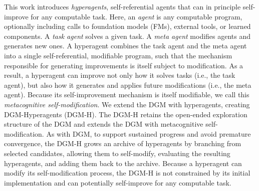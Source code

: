 \documentclass[]{fairmeta}
\begin{document}
This work introduces \textit{hyperagents}, self-referential agents that can in principle self-improve for any computable task. Here, an \textit{agent} is any computable program, optionally including calls to foundation models (FMs), external tools, or learned components. A \textit{task agent} solves a given task. A \textit{meta agent} modifies agents and generates new ones. A hyperagent combines the task agent and the meta agent into a single self-referential, modifiable program, such that the mechanism responsible for generating improvements is itself subject to modification. As a result, a hyperagent can improve not only how it solves tasks (i.e., the task agent), but also how it generates and applies future modifications (i.e., the meta agent). Because its self-improvement mechanism is itself modifiable, we call this \textit{metacognitive self-modification}.
We extend the DGM with hyperagents, creating DGM-Hyperagents (DGM-H). The DGM-H retains the open-ended exploration structure of the DGM and extends the DGM with metacognitive self-modification. As with DGM, to support sustained progress and avoid premature convergence, the DGM-H grows an archive of hyperagents by branching from selected candidates, allowing them to self-modify, evaluating the resulting hyperagents, and adding them back to the archive. Because a hyperagent can modify its self-modification process, the DGM-H is not constrained by its initial implementation and can potentially self-improve for any computable task.
\end{document}
